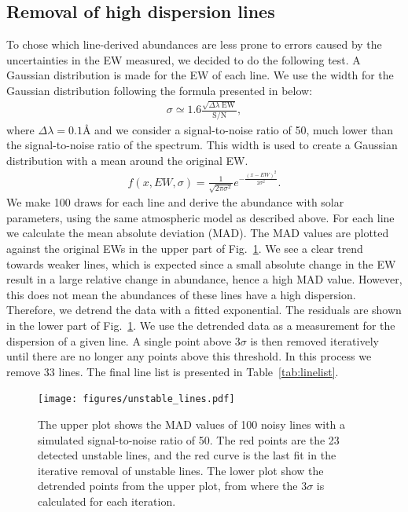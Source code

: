 \documentclass{aa}
\begin{document}
\subsection{Removal of high dispersion lines}
\label{sub:removal_of_unstable_lines}

To chose which line-derived abundances are less prone to errors caused
by the uncertainties in the EW measured, we decided to do the following
test. A Gaussian distribution is made for the EW of each line. We use
the width for the Gaussian distribution following the formula presented
in \citet{Caryel1988} below:
\begin{align}
    \sigma \simeq 1.6 \frac{\sqrt{\Delta\lambda\; \mathrm{EW}}}{\mathrm{S/N}},
\end{align}
where $\Delta\lambda=0.1\si{\angstrom}$ and we consider a
signal-to-noise ratio of 50, much lower than the signal-to-noise ratio
of the spectrum. This width is used to create a Gaussian distribution
with a mean around the original EW.
\begin{align}
    f(x, EW, \sigma) = \frac{1}{\sqrt{2\pi\sigma^2}} e^{-\frac{(x-EW)^2}{2\sigma^2}}.
\end{align}
We make 100 draws for each line and derive the abundance with solar
parameters, using the same atmospheric model as described above.
For each line we calculate the mean absolute deviation (MAD). The
MAD values are plotted against the original EWs in the upper part
of Fig.~\ref{fig:unstable_lines}. We see a clear trend towards
weaker lines, which is expected since a small absolute change in
the EW result in a large relative change in abundance, hence a high
MAD value. However, this does not mean the abundances of these
lines have a high dispersion. Therefore, we detrend the data with
a fitted exponential. The residuals are shown in the lower part
of Fig.~\ref{fig:unstable_lines}. We use the detrended data as a
measurement for the dispersion of a given line. A single point above $3
\sigma$ is then removed iteratively until there are no longer any points
above this threshold. In this process we remove 33 lines. The final line
list is presented in Table~\ref{tab:linelist}.

\begin{figure}[tbp!]
    \centering
    \texttt{[image: figures/unstable\_lines.pdf]}
    \caption{The upper plot shows the MAD values of 100 noisy lines
    with a simulated signal-to-noise ratio of 50. The red points are
    the 23 detected unstable lines, and the red curve is the last fit
    in the iterative removal of unstable lines. The lower plot show the
    detrended points from the upper plot, from where the $3\sigma$ is
    calculated for each iteration.}
    \label{fig:unstable_lines}
\end{figure}
\end{document}
